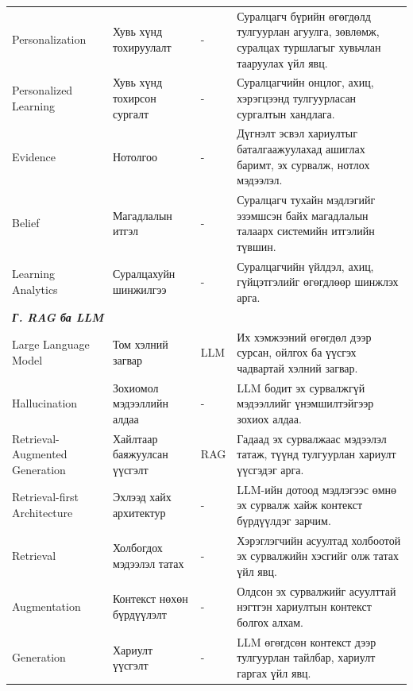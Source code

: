 {\begin{longtable}{p{} p{} p{} p{}}
Personalization & Хувь хүнд тохируулалт & - & Суралцагч бүрийн өгөгдөлд тулгуурлан агуулга, зөвлөмж, суралцах туршлагыг хувьчлан тааруулах үйл явц. \\

Personalized Learning & Хувь хүнд тохирсон сургалт & - & Суралцагчийн онцлог, ахиц, хэрэгцээнд тулгуурласан сургалтын хандлага. \\

Evidence & Нотолгоо & - & Дүгнэлт эсвэл хариултыг баталгаажуулахад ашиглах баримт, эх сурвалж, нотлох мэдээлэл. \\

Belief & Магадлалын итгэл & - & Суралцагч тухайн мэдлэгийг эзэмшсэн байх магадлалын талаарх системийн итгэлийн түвшин. \\

Learning Analytics & Суралцахуйн шинжилгээ & - & Суралцагчийн үйлдэл, ахиц, гүйцэтгэлийг өгөгдлөөр шинжлэх арга. \\

\midrule
\multicolumn{4}{l}{\textbf{\textit{Г. RAG ба LLM}}} \\
\midrule

Large Language Model & Том хэлний загвар & LLM & Их хэмжээний өгөгдөл дээр сурсан, ойлгох ба үүсгэх чадвартай хэлний загвар. \\

Hallucination & Зохиомол мэдээллийн алдаа & - & LLM бодит эх сурвалжгүй мэдээллийг үнэмшилтэйгээр зохиох алдаа. \\

Retrieval-Augmented Generation & Хайлтаар баяжуулсан үүсгэлт & RAG & Гадаад эх сурвалжаас мэдээлэл татаж, түүнд тулгуурлан хариулт үүсгэдэг арга. \\

Retrieval-first Architecture & Эхлээд хайх архитектур & - & LLM-ийн дотоод мэдлэгээс өмнө эх сурвалж хайж контекст бүрдүүлдэг зарчим. \\

Retrieval & Холбогдох мэдээлэл татах & - & Хэрэглэгчийн асуултад холбоотой эх сурвалжийн хэсгийг олж татах үйл явц. \\

Augmentation & Контекст нөхөн бүрдүүлэлт & - & Олдсон эх сурвалжийг асуулттай нэгтгэн хариултын контекст болгох алхам. \\

Generation & Хариулт үүсгэлт & - & LLM өгөгдсөн контекст дээр тулгуурлан тайлбар, хариулт гаргах үйл явц. \\


\end{longtable}}
